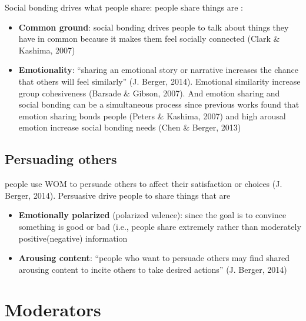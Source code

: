 \documentclass[
]{book}
\providecommand{\tightlist}{%
  \setlength{\itemsep}{0pt}\setlength{\parskip}{0pt}}
\begin{document}
Social bonding drives what people share: people share things are :

\begin{itemize}
\tightlist
\item
  \textbf{Common ground}: social bonding drives people to talk about things they have in common because it makes them feel socially connected (Clark \& Kashima, 2007)
\item
  \textbf{Emotionality}: ``sharing an emotional story or narrative increases the chance that others will feel similarly'' (J. Berger, 2014). Emotional similarity increase group cohesiveness (Barsade \& Gibson, 2007). And emotion sharing and social bonding can be a simultaneous process since previous works found that emotion sharing bonds people (Peters \& Kashima, 2007) and high arousal emotion increase social bonding needs (Chen \& Berger, 2013)
\end{itemize}

\hypertarget{persuading-others}{%
\subsection{Persuading others}\label{persuading-others}}

people use WOM to persuade others to affect their satisfaction or choices (J. Berger, 2014). Persuasive drive people to share things that are

\begin{itemize}
\tightlist
\item
  \textbf{Emotionally polarized} (polarized valence): since the goal is to convince something is good or bad (i.e., people share extremely rather than moderately positive(negative) information
\item
  \textbf{Arousing content}: ``people who want to persuade others may find shared arousing content to incite others to take desired actions'' (J. Berger, 2014)
\end{itemize}

\hypertarget{moderators}{%
\section{Moderators}\label{moderators}}
\end{document}
